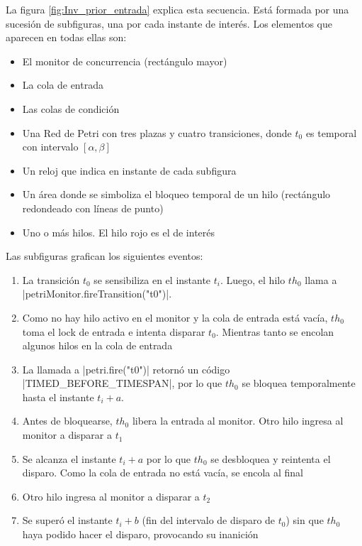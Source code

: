 La figura \ref{fig:Inv_prior_entrada} explica esta secuencia. Está formada por
una sucesión de subfiguras, una por cada instante de interés. Los elementos que
aparecen en todas ellas son:
\begin{itemize}
    \item El monitor de concurrencia (rectángulo mayor)
    \item La cola de entrada
    \item Las colas de condición
    \item Una Red de Petri con tres plazas y cuatro transiciones, donde $t_{0}$
    es temporal con intervalo $[\alpha,\beta]$
    \item Un reloj que indica en instante de cada subfigura
    \item Un área donde se simboliza el bloqueo temporal de un hilo (rectángulo
    redondeado con líneas de punto)
    \item Uno o más hilos. El hilo rojo es el de interés
\end{itemize}

Las subfiguras grafican los siguientes eventos:
\begin{enumerate}[label=\alph*)]
    \item La transición $t_{0}$ se sensibiliza en el instante $t_{i}$. Luego, el
    hilo $th_{0}$ llama a |petriMonitor.fireTransition("t0")|. 
    \item Como no hay hilo activo en el monitor y la cola de entrada está vacía,
    $th_{0}$ toma el lock de entrada e intenta disparar $t_{0}$. Mientras tanto
    se encolan algunos hilos en la cola de entrada
    \item La llamada a |petri.fire("t0")| retornó un código
    |TIMED_BEFORE_TIMESPAN|, por lo que $th_{0}$ se bloquea
    temporalmente hasta el instante $t_{i}+a$.
    \item Antes de bloquearse, $th_{0}$ libera la entrada al monitor. Otro hilo
    ingresa al monitor a disparar a $t_{1}$
    \item Se alcanza el instante $t_{i}+a$ por lo que $th_{0}$ se desbloquea y
    reintenta el disparo. Como la cola de entrada no está vacía, se encola al
    final
    \item Otro hilo ingresa al monitor a disparar a $t_{2}$
    \item Se superó el instante $t_{i}+b$ (fin del intervalo de disparo de
    $t_{0}$) sin que $th_{0}$ haya podido hacer el disparo, provocando su
    inanición
\end{enumerate}

